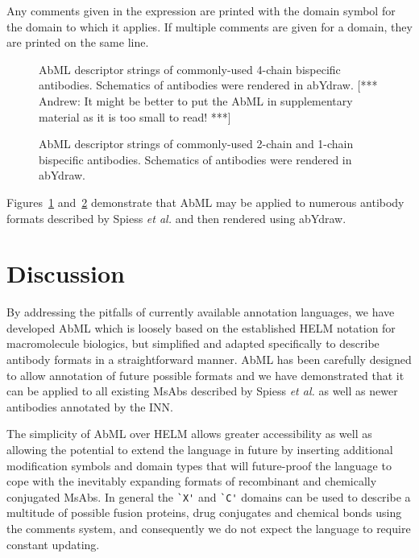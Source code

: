 \documentclass[a4]{article}
\newcommand{\etal}{\emph{et al.}}
\newcommand{\andrew}[1]{{\color{red} [*** Andrew: #1 ***]}}
\let\shortcite\cite
\begin{document}
Any
comments given in the expression are printed with the domain symbol for
the domain to which it applies. If multiple comments are
given for a domain, they are printed on the same line. 

\begin{figure}
\caption{\label{fig:2} AbML descriptor strings of commonly-used
4-chain bispecific antibodies. Schematics of antibodies were rendered
in abYdraw. \andrew{It might be better to put the AbML in supplementary
  material as it is too small to read!} }
\end{figure}

\begin{figure}
\caption{\label{fig:3} AbML descriptor strings of commonly-used
2-chain and 1-chain bispecific antibodies. Schematics of antibodies
were rendered in abYdraw.} 
\end{figure}

Figures~\ref{fig:2} and~\ref{fig:3} demonstrate that AbML may be
applied to numerous antibody formats described by Spiess \etal
\shortcite{spiess:2015} and then rendered using abYdraw.

\section{Discussion}

By addressing the pitfalls of currently available annotation languages,
we have developed AbML which is loosely 
based on the established HELM notation for macromolecule
biologics, but simplified and adapted specifically to describe antibody
formats in a straightforward  manner.
AbML has been carefully designed to allow annotation of future possible
formats and we have demonstrated that it can be applied to all existing
MsAbs described by Spiess \etal \shortcite{spiess:2015} as well as
newer antibodies annotated by the INN.

The simplicity of AbML over HELM allows greater accessibility
as well as allowing the potential to extend the language in future by inserting additional modification
symbols and domain types that will future-proof the language to cope
with the inevitably expanding formats of recombinant and chemically
conjugated MsAbs. In general the \verb|`X'| and \verb|`C'|
domains can be used to describe a multitude of possible fusion proteins,
drug conjugates and chemical bonds using the comments system, and consequently
we do not expect the language to require constant updating.
\end{document}
